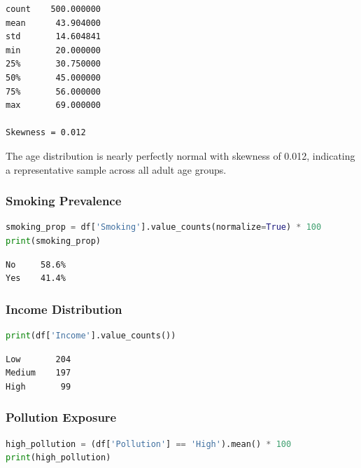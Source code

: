 \documentclass[12pt, a4paper]{article}
\begin{document}
\begin{outputbox}
\begin{verbatim}
count    500.000000
mean      43.904000
std       14.604841
min       20.000000
25%       30.750000
50%       45.000000
75%       56.000000
max       69.000000

Skewness = 0.012
\end{verbatim}
\end{outputbox}

\begin{insightbox}
The age distribution is nearly perfectly normal with skewness of 0.012, indicating a representative sample across all adult age groups.
\end{insightbox}

\subsubsection*{Smoking Prevalence}
\begin{lstlisting}[language=Python]
smoking_prop = df['Smoking'].value_counts(normalize=True) * 100
print(smoking_prop)
\end{lstlisting}

\begin{outputbox}
\begin{verbatim}
No     58.6%
Yes    41.4%
\end{verbatim}
\end{outputbox}

\subsubsection*{Income Distribution}
\begin{lstlisting}[language=Python]
print(df['Income'].value_counts())
\end{lstlisting}

\begin{outputbox}
\begin{verbatim}
Low       204
Medium    197
High       99
\end{verbatim}
\end{outputbox}

\subsubsection*{Pollution Exposure}
\begin{lstlisting}[language=Python]
high_pollution = (df['Pollution'] == 'High').mean() * 100
print(high_pollution)
\end{lstlisting}
\end{document}
